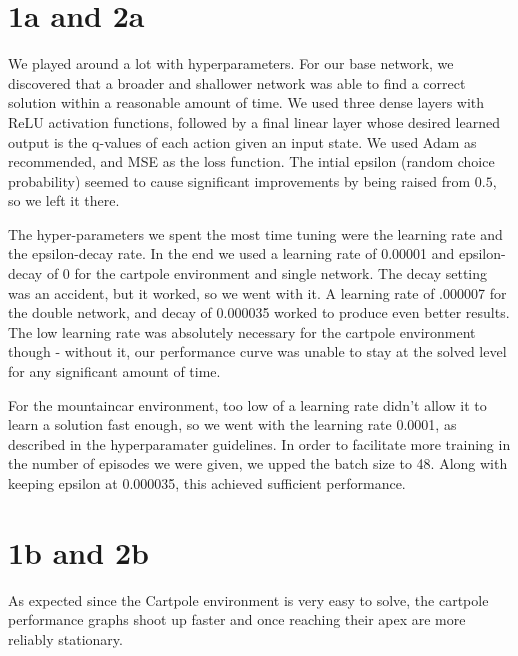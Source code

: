 \documentclass[12pt]{article}
\begin{document}
\begin{solution}
\section{1a and 2a}
We played around a lot with hyperparameters. For our base network, we discovered that a broader and shallower network was able to find a correct solution within a reasonable amount of time. We used three dense layers with ReLU activation functions, followed by a final linear layer whose desired learned output is the q-values of each action given an input state. We used Adam as recommended, and MSE as the loss function. The intial epsilon (random choice probability) seemed to cause significant improvements by being raised from $0.5$, so we left it there.

The hyper-parameters we spent the most time tuning were the learning rate and the epsilon-decay rate. In the end we used a learning rate of 0.00001 and epsilon-decay of 0 for the cartpole environment and single network. The decay setting was an accident, but it worked, so we went with it. A learning rate of .000007 for the double network, and decay of 0.000035 worked to produce even better results. The low learning rate was absolutely necessary for the cartpole environment though - without it, our performance curve was unable to stay at the solved level for any significant amount of time.

For the mountaincar environment, too low of a learning rate didn't allow it to learn a solution fast enough, so we went with the learning rate 0.0001, as described in the hyperparamater guidelines. In order to facilitate more training in the number of episodes we were given, we upped the batch size to 48. Along with keeping epsilon at  0.000035, this achieved sufficient performance.

\section{1b and 2b}

As expected since the Cartpole environment is very easy to solve, the cartpole performance graphs shoot up faster and once reaching their apex are more reliably stationary.


\end{solution}
\end{document}
